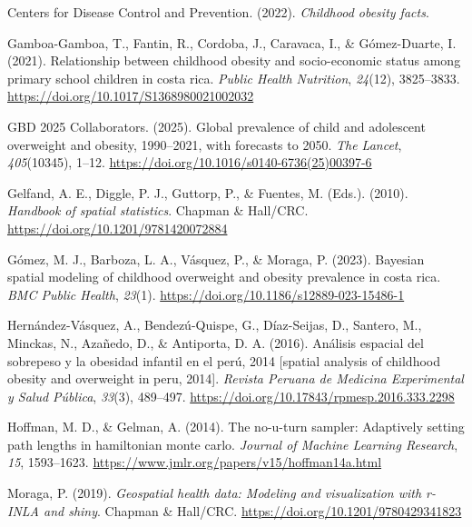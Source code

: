 \documentclass[
]{article}
\newlength{\cslhangindent}
\newenvironment{CSLReferences}[2] %
 {\begin{list}{}{%
  \setlength{\itemindent}{0pt}
  \setlength{\leftmargin}{0pt}
  \setlength{\parsep}{0pt}
  \ifodd #1
   \setlength{\leftmargin}{\cslhangindent}
   \setlength{\itemindent}{-1\cslhangindent}
  \fi
  \setlength{\itemsep}{#2\baselineskip}}}
 {\end{list}}
\begin{document}
\label{refs}
\begin{CSLReferences}{1}{0}
Centers for Disease Control and Prevention. (2022). \emph{Childhood
obesity facts}.

Gamboa-Gamboa, T., Fantin, R., Cordoba, J., Caravaca, I., \&
Gómez-Duarte, I. (2021). Relationship between childhood obesity and
socio-economic status among primary school children in costa rica.
\emph{Public Health Nutrition}, \emph{24}(12), 3825--3833.
\url{https://doi.org/10.1017/S1368980021002032}

GBD 2025 Collaborators. (2025). Global prevalence of child and
adolescent overweight and obesity, 1990--2021, with forecasts to 2050.
\emph{The Lancet}, \emph{405}(10345), 1--12.
\url{https://doi.org/10.1016/s0140-6736(25)00397-6}

Gelfand, A. E., Diggle, P. J., Guttorp, P., \& Fuentes, M. (Eds.).
(2010). \emph{Handbook of spatial statistics}. Chapman \& Hall/CRC.
\url{https://doi.org/10.1201/9781420072884}

Gómez, M. J., Barboza, L. A., Vásquez, P., \& Moraga, P. (2023).
Bayesian spatial modeling of childhood overweight and obesity prevalence
in costa rica. \emph{BMC Public Health}, \emph{23}(1).
\url{https://doi.org/10.1186/s12889-023-15486-1}

Hernández-Vásquez, A., Bendezú-Quispe, G., Díaz-Seijas, D., Santero, M.,
Minckas, N., Azañedo, D., \& Antiporta, D. A. (2016). Análisis espacial
del sobrepeso y la obesidad infantil en el perú, 2014 {[}spatial
analysis of childhood obesity and overweight in peru, 2014{]}.
\emph{Revista Peruana de Medicina Experimental y Salud Pública},
\emph{33}(3), 489--497.
\url{https://doi.org/10.17843/rpmesp.2016.333.2298}

Hoffman, M. D., \& Gelman, A. (2014). The no-u-turn sampler: Adaptively
setting path lengths in hamiltonian monte carlo. \emph{Journal of
Machine Learning Research}, \emph{15}, 1593--1623.
\url{https://www.jmlr.org/papers/v15/hoffman14a.html}

Moraga, P. (2019). \emph{Geospatial health data: Modeling and
visualization with r-INLA and shiny}. Chapman \& Hall/CRC.
\url{https://doi.org/10.1201/9780429341823}


\end{CSLReferences}
\end{document}
